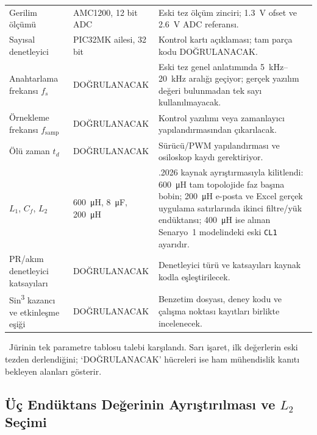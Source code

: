 \begin{longtable}{>{\raggedright\arraybackslash}p{} >{\raggedright\arraybackslash}p{} >{\raggedright\arraybackslash}p{}}
Gerilim ölçümü & AMC1200, 12 bit ADC & Eski tez ölçüm zinciri; \SI{1.3}{\volt} ofset ve \SI{2.6}{\volt} ADC referansı. \\
Sayısal denetleyici & PIC32MK ailesi, 32 bit & Kontrol kartı açıklaması; tam parça kodu DOĞRULANACAK. \\
Anahtarlama frekansı $f_s$ & {\small DOĞRULANACAK} & Eski tez genel anlatımında \SI{5}{\kilo\hertz}--\SI{20}{\kilo\hertz} aralığı geçiyor; gerçek yazılım değeri bulunmadan tek sayı kullanılmayacak. \\
Örnekleme frekansı $f_{\mathrm{samp}}$ & {\small DOĞRULANACAK} & Kontrol yazılımı veya zamanlayıcı yapılandırmasından çıkarılacak. \\
Ölü zaman $t_d$ & {\small DOĞRULANACAK} & Sürücü/PWM yapılandırması ve osiloskop kaydı gerektiriyor. \\
$L_1$, $C_f$, $L_2$ & \SI{600}{\micro\henry}, \SI{8}{\micro\farad}, \SI{200}{\micro\henry} & 26.08.2026 kaynak ayrıştırmasıyla kilitlendi: \SI{600}{\micro\henry} tam topolojide faz başına bobin; \SI{200}{\micro\henry} e-posta ve Excel gerçek uygulama satırlarında ikinci filtre/yük endüktansı; \SI{400}{\micro\henry} ise alınan Senaryo~1 modelindeki eski \texttt{CL1} ayarıdır. \\
PR/akım denetleyici katsayıları & {\small DOĞRULANACAK} & Denetleyici türü ve katsayıları kaynak kodla eşleştirilecek. \\
Sin\textsuperscript{3} kazancı ve etkinleşme eşiği & {\small DOĞRULANACAK} & Benzetim dosyası, deney kodu ve çalışma noktası kayıtları birlikte incelenecek. \\
\bottomrule
\end{longtable}

\begin{center}
\juriistegietiketi\ \small Jürinin tek parametre tablosu talebi karşılandı. Sarı işaret, ilk değerlerin eski tezden derlendiğini; `DOĞRULANACAK' hücreleri ise ham mühendislik kanıtı bekleyen alanları gösterir.
\end{center}

\subsection{Üç Endüktans Değerinin Ayrıştırılması ve $L_2$ Seçimi}

